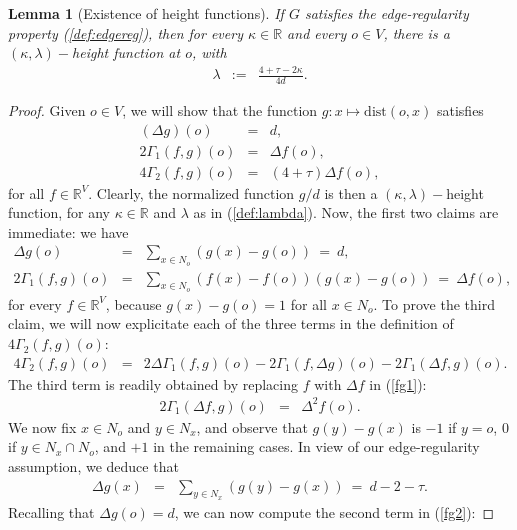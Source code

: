 \documentclass[10pt,a4paper]{amsart}
\newtheorem{lemma}{Lemma}
\newcommand{\dR}{\mathbb {R}}
\newcommand{\dist}{{\mathrm{dist}}}
\begin{document}
\begin{lemma}[Existence of height functions]\label{lm:height}If  $G$ satisfies the edge-regularity property (\ref{def:edgereg}), then for every $\kappa\in\dR$ and every $o\in V$, there is a $(\kappa,\lambda)-$height function at $o$, with 
\begin{eqnarray}
\label{def:lambda}
\lambda & := & \frac{4+\tau-2\kappa}{4d}.
\end{eqnarray}
\end{lemma}
\begin{proof}
Given $o\in V$, we will show that the function  $g\colon x\mapsto \dist(o,x)$ satisfies
\begin{eqnarray}
(\Delta g)(o) & = & d,\\
2\Gamma_1(f,g)(o) & = & \Delta f(o),\\
4\Gamma_2(f,g)(o) & = &(4+\tau) \Delta f(o),
\end{eqnarray}
for all  $f\in \dR^V$. Clearly, the normalized function $g/d$ is then a $(\kappa,\lambda)-$height function, for any $\kappa\in\dR$ and $\lambda$ as in (\ref{def:lambda}). Now, the first two claims are immediate: we have
\begin{eqnarray}
\label{g}
\Delta g(o) & = & \sum_{x\in N_o}\left(g(x)-g(o)\right) \ = \ d,\\
\label{fg1}2\Gamma_1(f,g)(o) & = & \sum_{x\in N_o}\left(f(x)-f(o)\right)\left(g(x)-g(o)\right) \ = \ \Delta f(o),
\end{eqnarray}
for every  $f\in \dR^V$, because $g(x)-g(o)=1$ for all $x\in N_o$. To prove the third claim, we will now explicitate each of the three terms in the definition of $4\Gamma_2(f,g)(o)$:
\begin{eqnarray}
\label{fg2}
4\Gamma_2(f,g)(o) & = & 2\Delta\Gamma_1(f,g)(o)-2\Gamma_1(f,\Delta g)(o)-2\Gamma_1(\Delta f,g)(o).
\end{eqnarray}
The third term is readily obtained by replacing $f$ with $\Delta f$ in (\ref{fg1}):
\begin{eqnarray}
2\Gamma_1(\Delta f,g)(o) & = &  \Delta^2 f(o).
\end{eqnarray}
We now fix $x\in N_o$ and $y\in N_x$, and observe that $g(y)-g(x)$ is $-1$ if $y=o$, $0$ if $y\in N_x\cap N_o$, and $+1$ in the remaining cases. In view of our edge-regularity assumption, we deduce that
\begin{eqnarray*}
\Delta g(x) & = & \sum_{y\in N_x}\left(g(y)-g(x)\right) \ = \ d-2-\tau.
\end{eqnarray*}
Recalling that $\Delta g(o)=d$, we can now compute the second term in (\ref{fg2}):

\end{proof}
\end{document}
